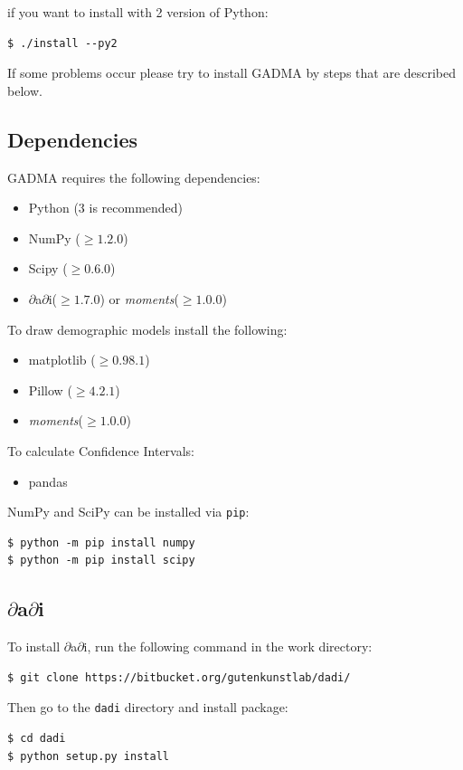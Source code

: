 \documentclass[12pt]{article}
\makeatletter
\newcommand{\dadi}{$\partial$a$\partial$i\xspace}
\newcommand{\moments}{\textit{moments}\xspace}
\newcommand{\py}[1]{\lstinline[language=Python, showstringspaces=False]@#1@}
\makeatother
\begin{document}
if you want to install with 2 version of Python:
\begin{lstlisting}
$ ./install --py2
\end{lstlisting}

If some problems occur please try to install GADMA by steps that are described below.

\subsection{Dependencies}
GADMA requires the following dependencies:
\begin{itemize}
    \item Python (3 is recommended)
    \item NumPy ($\geq 1.2.0$)
    \item Scipy ($\geq 0.6.0$)
    \item \dadi ($\geq 1.7.0$) or \moments ($\geq 1.0.0$)
\end{itemize}
To draw demographic models install the following:
\begin{itemize}
    \item matplotlib ($\geq 0.98.1$)
    \item Pillow ($\geq 4.2.1$)
    \item \moments ($\geq 1.0.0$)
\end{itemize}
To calculate Confidence Intervals:
\begin{itemize}
    \item pandas
\end{itemize}

NumPy and SciPy can be installed via \py{pip}:
\begin{lstlisting}
$ python -m pip install numpy
$ python -m pip install scipy
\end{lstlisting}

\subsection{\dadi}
To install \dadi, run the following command in the work directory:

\begin{lstlisting}
$ git clone https://bitbucket.org/gutenkunstlab/dadi/
\end{lstlisting}

Then go to the \py{dadi} directory and install package:

\begin{lstlisting}
$ cd dadi
$ python setup.py install
\end{lstlisting}
\end{document}
